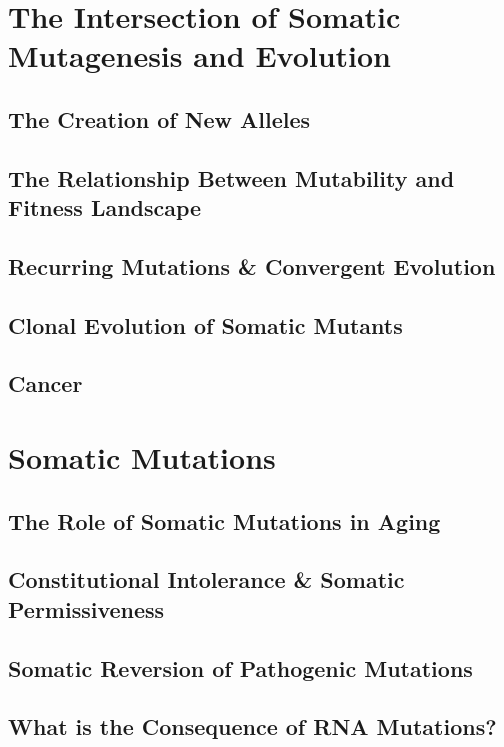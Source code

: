 \section{The Intersection of Somatic Mutagenesis and Evolution}
\subsection{The Creation of New Alleles}
\subsection{The Relationship Between Mutability and Fitness Landscape}
\subsection{Recurring Mutations \& Convergent Evolution}
\subsection{Clonal Evolution of Somatic Mutants}
\subsection{Cancer}










\section{Somatic Mutations}
\subsection{The Role of Somatic Mutations in Aging}
\subsection{Constitutional Intolerance \& Somatic Permissiveness}
\subsection{Somatic Reversion of Pathogenic Mutations}
\subsection{What is the Consequence of RNA Mutations?} 

